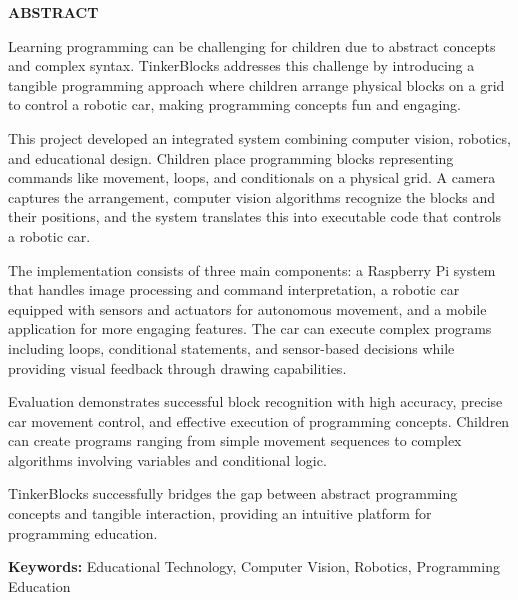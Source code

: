 \begin{center}
    \Large \textbf{ABSTRACT}
\end{center}

\vspace{1cm}

Learning programming can be challenging for children due to abstract concepts and complex syntax. TinkerBlocks addresses this challenge by introducing a tangible programming approach where children arrange physical blocks on a grid to control a robotic car, making programming concepts fun and engaging.

This project developed an integrated system combining computer vision, robotics, and educational design. Children place programming blocks representing commands like movement, loops, and conditionals on a physical grid. A camera captures the arrangement, computer vision algorithms recognize the blocks and their positions, and the system translates this into executable code that controls a robotic car.

The implementation consists of three main components: a Raspberry Pi system that handles image processing and command interpretation, a robotic car equipped with sensors and actuators for autonomous movement, and a mobile application for more engaging features. The car can execute complex programs including loops, conditional statements, and sensor-based decisions while providing visual feedback through drawing capabilities.

Evaluation demonstrates successful block recognition with high accuracy, precise car movement control, and effective execution of programming concepts. Children can create programs ranging from simple movement sequences to complex algorithms involving variables and conditional logic.

TinkerBlocks successfully bridges the gap between abstract programming concepts and tangible interaction, providing an intuitive platform for programming education.

\textbf{Keywords:} Educational Technology, Computer Vision, Robotics, Programming Education